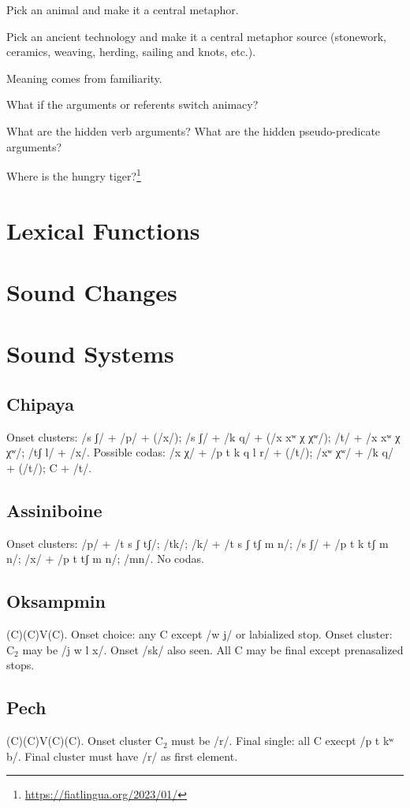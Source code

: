 \documentclass[11pt]{article}
\begin{document}
Pick an animal and make it a central metaphor.

Pick an ancient technology and make it a central metaphor source
(stonework, ceramics, weaving, herding, sailing and knots, etc.).

Meaning comes from familiarity.

What if the arguments or referents switch animacy?

What are the hidden verb arguments?  What are the hidden
pseudo-predicate arguments?

Where is the hungry tiger?\footnote{\url{https://fiatlingua.org/2023/01/}}

\section{Lexical Functions}


\section{Sound Changes}
{\small

}

\section{Sound Systems}

\subsection{Chipaya} Onset clusters: /s ʃ/ + /p/ + (/x/); /s ʃ/ + /k q/ +
(/x xʷ χ χʷ/); /t/ + /x xʷ χ χʷ/; /tʃ l/ + /x/.  Possible codas: /x χ/
+ /p t k q l r/ + (/t/); /xʷ χʷ/ + /k q/ + (/t/); C + /t/. 

\subsection{Assiniboine} Onset clusters: /p/ + /t s ʃ tʃ/; /tk/; /k/ +
/t s ʃ tʃ m n/; /s ʃ/ + /p t k tʃ m n/; /x/ + /p t tʃ m n/; /mn/.  No
codas. 

\subsection{Oksampmin} (C)(C)V(C).  Onset choice: any C except /w j/
or labialized stop.  Onset cluster: C$_{2}$ may be /j w l x/.  Onset
/sk/ also seen.  All C may be final except prenasalized stops.

\subsection{Pech} (C)(C)V(C)(C).  Onset cluster C$_{2}$ must be /r/.
Final single: all C execpt /p t kʷ b/.  Final cluster must have /r/ as
first element.
\end{document}
